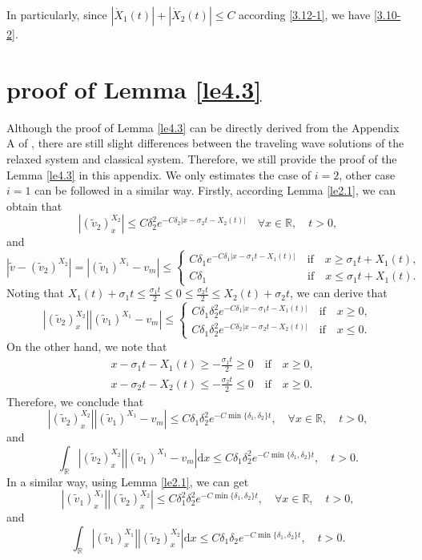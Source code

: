 \documentclass[10pt,reqno]{amsart}
\numberwithin{equation}{section}
\newcommand{\dif}{\mathrm{d}}
\begin{document}
In particularly, since $|\dot X_1(t)|+|\dot X_2(t)|\le C $ according \eqref{3.12-1}, we have \eqref{3.10-2}.

\section{proof of Lemma \ref{le4.3}}

Although the proof of Lemma \ref{le4.3} can be directly derived from the Appendix A of \cite{SMJ}, there are still slight differences between the traveling wave solutions of the relaxed system and classical system. Therefore, we still provide the proof of the Lemma \ref{le4.3} in this appendix.
We only estimates the case of $i=2$, other case $i=1$ can be followed in a similar way.
Firstly, according Lemma \ref{le2.1}, we can obtain that
\[
|(\widetilde{v}_2)^{X_2}_x|\le C\delta_2^2e^{-C\delta_2|x-\sigma_2 t-X_2(t)|}\quad \forall x\in\mathbb{R},\quad t>0,
\]
and
\[
|\widetilde v-(\widetilde{v}_2)^{X_2}|=|(\widetilde{v}_1)^{X_1}-v_m|\le
\begin{cases}
C\delta_1e^{-C\delta_1|x-\sigma_1 t-X_1(t)|}\quad \text{if} \quad x\ge\sigma_1t+X_1(t),\\
C\delta_1\quad\quad \quad\qquad \qquad  \qquad  \text{if} \quad x\le\sigma_1t+X_1(t).
\end{cases}
\]
Noting that $X_1(t)+\sigma_1t\le\frac{\sigma_1t}{2}\le0\le\frac{\sigma_2t}{2}\le X_2(t)+\sigma_2t$, we can derive that
\[
|(\widetilde{v}_2)^{X_2}_x||(\widetilde{v}_1)^{X_1}-v_m|\le
\begin{cases}
C\delta_1\delta_2^2e^{-C\delta_1|x-\sigma_1 t-X_1(t)|}\quad \text{if} \quad x\ge0,\\
C\delta_1\delta_2^2e^{-C\delta_2|x-\sigma_2 t-X_2(t)|} \quad \text{if}\quad x\le0.
\end{cases}
\]
On the other hand, we note that
\begin{align*}
&x-\sigma_1 t-X_1(t)\ge -\frac{\sigma_1t}{2}\ge0\quad \text{if} \quad x\ge0,\\
&x-\sigma_2 t-X_2(t)\le -\frac{\sigma_2t}{2}\le0\quad \text{if} \quad x\ge0.
\end{align*}
Therefore, we conclude that
\[
|(\widetilde{v}_2)^{X_2}_x||(\widetilde{v}_1)^{X_1}-v_m|\le
C\delta_1\delta_2^2e^{-C\min\{\delta_1, \delta_2\}t},\quad \forall x\in\mathbb{R},\quad t>0,
\]
and
\[
\int_{\mathbb{R}}|(\widetilde{v}_2)^{X_2}_x||(\widetilde{v}_1)^{X_1}-v_m|\dif x\le
C\delta_1\delta_2^2e^{-C\min\{\delta_1, \delta_2\}t},\quad t>0.
\]
In a similar way, using Lemma \ref{le2.1}, we can get
\[
|(\widetilde{v}_1)^{X_1}_x||(\widetilde{v}_2)^{X_2}_x|\le
C\delta_1^2\delta_2^2e^{-C\min\{\delta_1, \delta_2\}t},\quad \forall x\in\mathbb{R},\quad t>0,
\]
and
\[
\int_{\mathbb{R}}|(\widetilde{v}_1)^{X_1}_x||(\widetilde{v}_2)^{X_2}_x|\dif x\le
C\delta_1\delta_2e^{-C\min\{\delta_1, \delta_2\}t},\quad t>0.
\]
\end{document}
